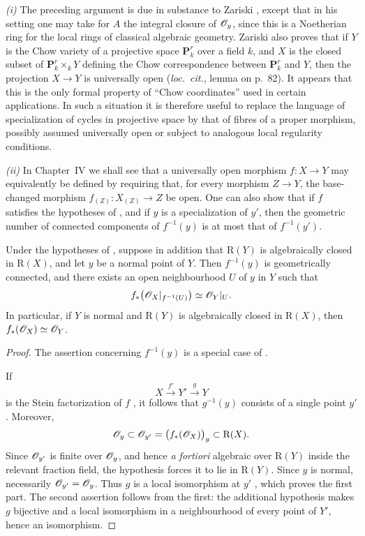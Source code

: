 \begin{remark}[4.3.11]
\label{III.4.3.11}
\emph{(i)}
The preceding argument is due in substance to Zariski
\cite{I-20}, except that in his setting one may take for $A$ the
integral closure of $\mathscr{O}_y$, since this is a Noetherian ring for
the local rings of classical algebraic geometry.  Zariski also
proves that if $Y$ is the Chow variety of a projective space
$\mathbf{P}_k^r$ over a field $k$, and $X$ is the closed subset of
$\mathbf{P}_k^r\times_kY$ defining the Chow correspondence between
$\mathbf{P}_k^r$ and $Y$, then the projection $X\to Y$ is
universally open (\emph{loc.\ cit.}, lemma on p.~82).
It appears that this is the only formal property of ``Chow
coordinates'' used in certain applications.  In such a situation it
is therefore useful to replace the language of specialization of
cycles in projective space by that of fibres of a proper morphism,
possibly assumed universally open or subject to analogous local
regularity conditions.

\emph{(ii)}
In Chapter~IV we shall see that a universally open morphism
$f:X\to Y$ may equivalently be defined by requiring that, for every
morphism $Z\to Y$, the base-changed morphism
$f_{(Z)}:X_{(Z)}\to Z$ be open.  One can also show that if $f$
satisfies the hypotheses of , and if $y$ is a
specialization of $y'$, then the geometric number of connected
components of $f^{-1}(y)$ is at most that of $f^{-1}(y')$.
\end{remark}

\begin{corollary}[4.3.12]
\label{III.4.3.12}
Under the hypotheses of , suppose in addition that
$\mathrm{R}(Y)$ is algebraically closed in $\mathrm{R}(X)$, and let $y$ be a
normal point of $Y$.  Then $f^{-1}(y)$ is geometrically connected,
and there exists an open neighbourhood $U$ of $y$ in $Y$ such that
\[
  f_*\bigl(\mathscr{O}_X|_{f^{-1}(U)}\bigr)
  \simeq
  \mathscr{O}_Y|_U.
\]
In particular, if $Y$ is normal and $\mathrm{R}(Y)$ is algebraically closed
in $\mathrm{R}(X)$, then $f_*(\mathscr{O}_X)\simeq\mathscr{O}_Y$.
\end{corollary}

\begin{proof}
The assertion concerning $f^{-1}(y)$ is a special case of
.


If
\[
  X\xrightarrow{f'}Y'\xrightarrow{g}Y
\]
is the Stein factorization of $f$ , it follows that
$g^{-1}(y)$ consists of a single point $y'$.  Moreover,
\[
  \mathscr{O}_y
  \subset
  \mathscr{O}_{y'}
  =
  \bigl(f_*(\mathscr{O}_X)\bigr)_y
  \subset
  \mathrm{R}(X).
\]
Since $\mathscr{O}_{y'}$ is finite over $\mathscr{O}_y$, and hence
\emph{a fortiori} algebraic over $\mathrm{R}(Y)$ inside the relevant
fraction field, the hypothesis forces it to lie in $\mathrm{R}(Y)$.  Since
$y$ is normal, necessarily $\mathscr{O}_{y'}=\mathscr{O}_y$.  Thus $g$ is a
local isomorphism at $y'$ , which proves the first
part.  The second assertion follows from the first: the additional
hypothesis makes $g$ bijective and a local isomorphism in a
neighbourhood of every point of $Y'$, hence an isomorphism.
\end{proof}

